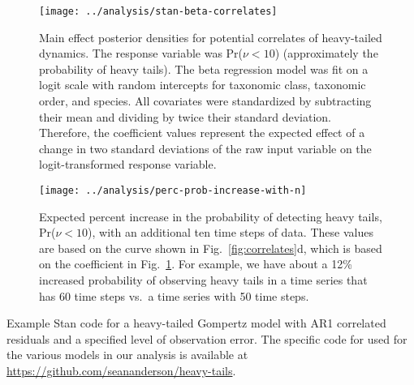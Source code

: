 \clearpage

\begin{figure}[htbp]
\begin{center}
\texttt{[image: ../analysis/stan-beta-correlates]}
\caption{
  Main effect posterior densities for potential correlates of heavy-tailed
  dynamics. The response variable was Pr($\nu < 10$) (approximately the
  probability of heavy tails). The beta regression model was fit on a logit
  scale with random intercepts for taxonomic class, taxonomic order, and
  species. All covariates were standardized by subtracting their mean and
  dividing by twice their standard deviation. Therefore, the coefficient values
  represent the expected effect of a change in two standard deviations of the
  raw input variable on the logit-transformed response variable.
}
    \label{fig:correlate-coefs}
\end{center}
\end{figure}

\clearpage

\begin{figure}[htbp]
\begin{center}
\texttt{[image: ../analysis/perc-prob-increase-with-n]}
\caption{
Expected percent increase in the probability of detecting heavy tails, Pr($\nu
< 10$), with an additional ten time steps of data. These values are based on
the curve shown in Fig.~\ref{fig:correlates}d, which is based on the
coefficient in Fig.~\ref{fig:correlate-coefs}. For example, we have about
a 12\% increased probability of observing heavy tails in a time series that has
60 time steps vs.\ a time series with 50 time steps.
}
\label{fig:perc-inc-p}
\end{center}
\end{figure}

\clearpage

\noindent
Example Stan code for a heavy-tailed Gompertz model with AR1 correlated
residuals and a specified level of observation error. The specific code for used for the various models in our analysis is available at \url{https://github.com/seananderson/heavy-tails}.

